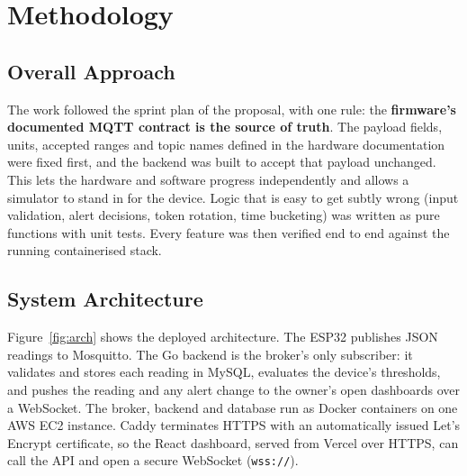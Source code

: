 \documentclass[11pt,a4paper,oneside]{report}
\newcommand{\code}[1]{\texttt{#1}}
\begin{document}
\chapter{Methodology}

\section{Overall Approach}
The work followed the sprint plan of the proposal, with one rule: the
\textbf{firmware's documented MQTT contract is the source of truth}. The payload
fields, units, accepted ranges and topic names defined in the hardware documentation
were fixed first, and the backend was built to accept that payload unchanged. This lets
the hardware and software progress independently and allows a simulator to stand in
for the device. Logic that is easy to get subtly wrong (input validation, alert
decisions, token rotation, time bucketing) was written as pure functions with unit
tests. Every feature was then verified end to end against the running containerised
stack.

\section{System Architecture}
Figure~\ref{fig:arch} shows the deployed architecture. The ESP32 publishes JSON
readings to Mosquitto. The Go backend is the broker's only subscriber: it validates and
stores each reading in MySQL, evaluates the device's thresholds, and pushes the reading
and any alert change to the owner's open dashboards over a WebSocket. The broker,
backend and database run as Docker containers on one AWS EC2 instance. Caddy
terminates HTTPS with an automatically issued Let's Encrypt certificate, so the React
dashboard, served from Vercel over HTTPS, can call the API and open a secure
WebSocket (\code{wss://}).
\end{document}
